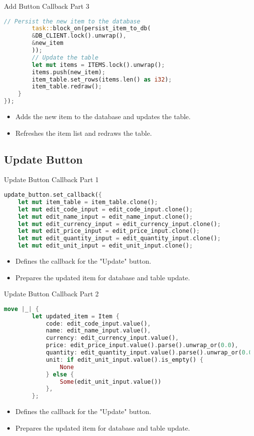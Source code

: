 \documentclass[aspectratio=169, table]{beamer}
\begin{document}
\begin{frame}[fragile]{Add Button Callback Part 3}
	\vspace{15pt}
	\begin{lstlisting}[language=Rust]
		// Persist the new item to the database
		task::block_on(persist_item_to_db(
		&DB_CLIENT.lock().unwrap(),
		&new_item
		));
		// Update the table
		let mut items = ITEMS.lock().unwrap();
		items.push(new_item);
		item_table.set_rows(items.len() as i32);
		item_table.redraw();
	}
});
\end{lstlisting}

\begin{itemize}
\item Adds the new item to the database and updates the table.
\item Refreshes the item list and redraws the table.
\end{itemize}
\end{frame}

\subsection{Update Button}
\begin{frame}[fragile]{Update Button Callback Part 1}
\vspace{15pt}
\begin{lstlisting}[language=Rust]
update_button.set_callback({
	let mut item_table = item_table.clone();
	let mut edit_code_input = edit_code_input.clone();
	let mut edit_name_input = edit_name_input.clone();
	let mut edit_currency_input = edit_currency_input.clone();
	let mut edit_price_input = edit_price_input.clone();
	let mut edit_quantity_input = edit_quantity_input.clone();
	let mut edit_unit_input = edit_unit_input.clone();
\end{lstlisting}
\begin{itemize}
	\item Defines the callback for the "Update" button.
	\item Prepares the updated item for database and table update.
\end{itemize}
\end{frame}

\begin{frame}[fragile]{Update Button Callback Part 2}
\vspace{15pt}
\begin{lstlisting}[language=Rust]
	move |_| {
		let updated_item = Item {
			code: edit_code_input.value(),
			name: edit_name_input.value(),
			currency: edit_currency_input.value(),
			price: edit_price_input.value().parse().unwrap_or(0.0),
			quantity: edit_quantity_input.value().parse().unwrap_or(0.0),
			unit: if edit_unit_input.value().is_empty() {
				None
			} else {
				Some(edit_unit_input.value())
			},
		};
	\end{lstlisting}
	\begin{itemize}
		\item Defines the callback for the "Update" button.
		\item Prepares the updated item for database and table update.
	\end{itemize}
\end{frame}
\end{document}
